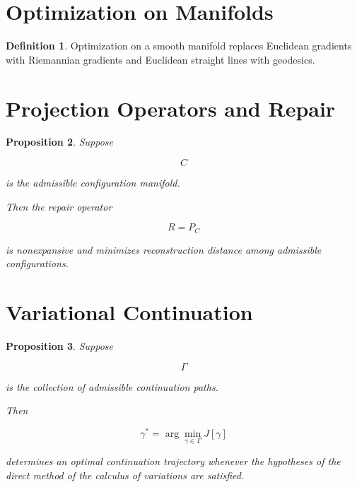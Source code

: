 \documentclass[11pt]{book}
\numberwithin{equation}{chapter}
\theoremstyle{definition}
\newtheorem{definition}{Definition}[chapter]
\theoremstyle{plain}
\newtheorem{proposition}[definition]{Proposition}
\begin{document}
\section{Optimization on Manifolds}

\begin{definition}

Optimization on a smooth manifold replaces Euclidean gradients with
Riemannian gradients and Euclidean straight lines with geodesics.

\end{definition}


\section{Projection Operators and Repair}

\begin{proposition}

Suppose

\[
C
\]

is the admissible configuration manifold.

Then the repair operator

\[
R
=
P_C
\]

is nonexpansive and minimizes reconstruction distance among admissible
configurations.

\end{proposition}


\section{Variational Continuation}

\begin{proposition}

Suppose

\[
\Gamma
\]

is the collection of admissible continuation paths.

Then

\[
\gamma^*
=
\arg\min_{\gamma\in\Gamma}
J[\gamma]
\]

determines an optimal continuation trajectory whenever the hypotheses of
the direct method of the calculus of variations are satisfied.

\end{proposition}
\end{document}
